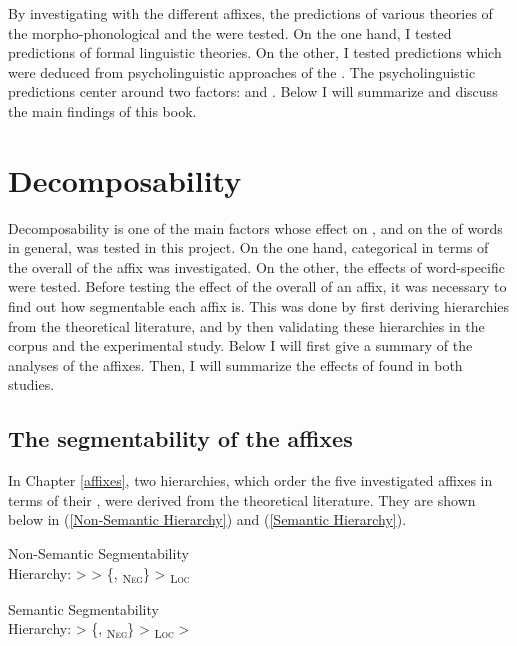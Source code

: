By investigating  with the different affixes, the predictions of various theories of the morpho-phonological and the  were tested. On the one hand, I tested predictions of formal linguistic theories. On the other, I tested predictions which were deduced from psycholinguistic approaches of the . The psycholinguistic predictions center around two factors:  and .  Below I will summarize and discuss the main findings of this book.



\section{Decomposability}

Decomposability is one of the main factors whose effect on , and on the  of words in general, was tested in this project. On the one hand, categorical  in terms of the overall  of the affix was investigated. On the other, the effects of word-specific  were tested. 
Before testing the effect of the overall  of an affix, it was necessary to find out how segmentable each affix is. This was done by first deriving  hierarchies from the theoretical literature, and by then validating these hierarchies  in the corpus and the experimental study. Below I will first give a summary of the  analyses of the affixes. Then, I will summarize the effects of  found in both studies.



\subsection{The segmentability of the affixes}

In Chapter \ref{affixes}, two  hierarchies, which order the five investigated affixes in terms of their , were derived from the theoretical literature. They are shown below in (\ref{Non-Semantic Hierarchy})  and (\ref{Semantic Hierarchy}). 


	\begin{exe}
		\ex \label{Non-Semantic Hierarchy} {Non-Semantic Segmentability }\\
		Hierarchy:\hspace*{3.5cm}   >  > \{, \textsubscript{\textsc{Neg}}\} >  \textsubscript{\textsc{Loc}}
		
				\ex \label{Semantic Hierarchy} 	{Semantic Segmentability }\\
				Hierarchy: \hspace*{3.5cm}  > \{, \textsubscript{\textsc{Neg}}\} >  \textsubscript{\textsc{Loc}} > 
	\end{exe}

